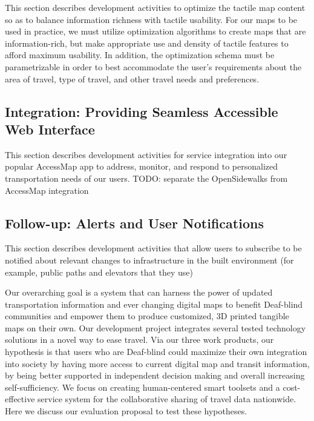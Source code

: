 This section describes development activities to optimize the tactile map content so as to balance information richness with tactile usability. For our maps to be used in practice, we must utilize optimization algorithms to create maps that are information-rich, but make appropriate use and density of tactile features to afford maximum usability.
In addition, the optimization schema must be parametrizable in order to best accommodate the user’s requirements about the area of travel, type of travel, and other travel needs and preferences.
\label{sec:optimize}


\subsection{Integration: Providing Seamless Accessible Web Interface}
This section describes development activities for service integration into our popular AccessMap app to address, monitor, and respond to personalized transportation needs of our users.
\ac{TODO: separate the OpenSidewalks from AccessMap integration}
\label{sec:accessmap-integration}


\subsection{Follow-up: Alerts and User Notifications}
This section describes development activities that allow users to subscribe to be notified about relevant changes to infrastructure in the built environment (for example, public paths and elevators that they use)
\label{sec:alerts}


Our overarching goal is a system that can harness the power of updated transportation information and ever changing digital maps to benefit Deaf-blind communities and empower them to produce customized, 3D printed tangible maps on their own. Our development project integrates several tested technology solutions in a novel way to ease travel. Via our three work products, our hypothesis is that users who are Deaf-blind could maximize their own integration into society by having more access to current digital map and transit information, by being better supported in independent decision making and overall increasing self-sufficiency. We focus on creating human-centered smart toolsets  and a cost-effective service system for the collaborative sharing of travel data nationwide. Here we discuss our evaluation proposal to test these hypotheses.


